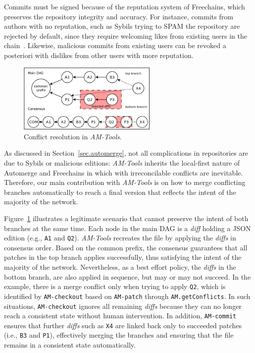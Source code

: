 \documentclass[12pt]{article}
\newcommand{\AMT}      {\emph{AM-Tools}\xspace}
\newcommand{\code}[1]  {\texttt{\footnotesize{#1}}}
\newcommand{\ampatch}    {\code{AM-patch}\xspace}
\newcommand{\amcheckout} {\code{AM-checkout}\xspace}
\newcommand{\amcommit}   {\code{AM-commit}\xspace}
\begin{document}
Commits must be signed because of the reputation system of Freechains, which
preserves the repository integrity and accuracy.
For instance, commits from authors with no reputation, such as Sybils trying to
SPAM the repository are rejected by default, since they require welcoming likes
from existing users in the chain~\cite{fcs.sbseg20}.
Likewise, malicious commits from existing users can be revoked a posteriori
with dislikes from other users with more reputation.

\begin{figure}
    \includegraphics[width=0.6\textwidth]{conflicts.png}
    \caption{Conflict resolution in \AMT.}
    \label{fig.conflicts}
\end{figure}

As discussed in Section~\ref{sec.automerge}, not all complications in
repositories are due to Sybils or malicious editions:
\AMT inherits the local-first nature of Automerge and Freechains in which
with irreconcilable conflicts are inevitable.
%
Therefore, our main contribution with \AMT is on how to merge conflicting
branches automatically to reach a final version that reflects the intent of the
majority of the network.

Figure~\ref{fig.conflicts} illustrates a legitimate scenario that cannot
preserve the intent of both branches at the same time.
Each node in the main DAG is a \emph{diff} holding a JSON edition (e.g.,
\code{A1} and \code{Q2}).
\AMT recreates the file by applying the \emph{diffs} in consensus order.
Based on the common prefix, the consensus guarantees that all patches in the
top branch applies successfully, thus satisfying the intent of the majority of
the network.
Nevertheless, as a best effort policy, the \emph{diffs} in the bottom branch,
are also applied in sequence, but may or may not succeed.
In the example, there is a merge conflict only when trying to apply \code{Q2},
which is identified by \amcheckout based on \ampatch through
\code{AM.getConflicts}.
%
In such situations, \amcheckout ignores all remaining \emph{diffs} because they
can no longer reach a consistent state without human intervention.
In addition, \amcommit ensures that further \emph{diffs} such as \code{X4} are
linked back only to succeeded patches (i.e., \code{B3} and \code{P1}),
effectively merging the branches and ensuring that the file remains in a
consistent state automatically.
\end{document}
